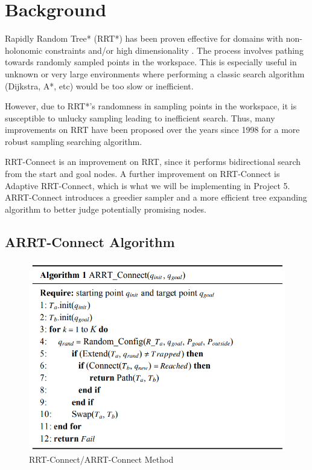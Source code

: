 \documentclass[conference]{IEEEtran}
\begin{document}
\section{Background}
Rapidly Random Tree* (RRT*) has been proven effective for domains with non-holonomic constraints and/or high dimensionality \cite{b5}. The process involves pathing towards randomly sampled points in the workspace. This is especially useful in unknown or very large environments where performing a classic search algorithm (Dijkstra, A*, etc) would be too slow or inefficient.

However, due to RRT*'s randomness in sampling points in the workspace, it is susceptible to unlucky sampling leading to inefficient search. Thus, many improvements on RRT have been proposed over the years since 1998 for a more robust sampling searching algorithm.

RRT-Connect is an improvement on RRT, since it performs bidirectional search from the start and goal nodes\cite{b2}. A further improvement on RRT-Connect is Adaptive RRT-Connect, which is what we will be implementing in Project 5. ARRT-Connect introduces a greedier sampler and a more efficient tree expanding algorithm to better judge potentially promising nodes\cite{b4}.

\subsection{ARRT-Connect Algorithm}


\begin{figure}[!t]
  \centering
  \includegraphics[width=\linewidth]{algorithm1}  %
  \caption{RRT-Connect/ARRT-Connect Method}
  \label{fig:five}
\end{figure}
\end{document}

